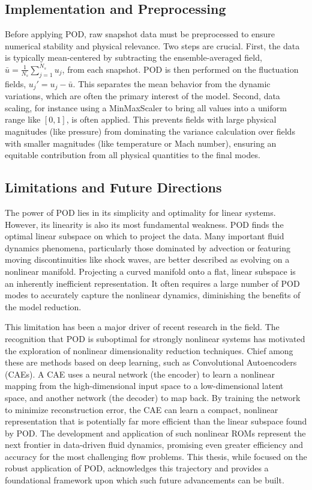 \documentclass[dscexam, EN]{ufabcFHZh}
\begin{document}
\subsection{Implementation and Preprocessing}

Before applying POD, raw snapshot data must be preprocessed to ensure numerical stability and physical relevance. Two steps are crucial. First, the data is typically mean-centered by subtracting the ensemble-averaged field, $\bar{u} = \frac{1}{N_s}\sum_{j=1}^{N_s} u_j$, from each snapshot. POD is then performed on the fluctuation fields, $u_j' = u_j - \bar{u}$. This separates the mean behavior from the dynamic variations, which are often the primary interest of the model. Second, data scaling, for instance using a MinMaxScaler to bring all values into a uniform range like $[0, 1]$, is often applied. This prevents fields with large physical magnitudes (like pressure) from dominating the variance calculation over fields with smaller magnitudes (like temperature or Mach number), ensuring an equitable contribution from all physical quantities to the final modes.

\subsection{Limitations and Future Directions}

The power of POD lies in its simplicity and optimality for linear systems. However, its linearity is also its most fundamental weakness. POD finds the optimal linear subspace on which to project the data. Many important fluid dynamics phenomena, particularly those dominated by advection or featuring moving discontinuities like shock waves, are better described as evolving on a nonlinear manifold. Projecting a curved manifold onto a flat, linear subspace is an inherently inefficient representation. It often requires a large number of POD modes to accurately capture the nonlinear dynamics, diminishing the benefits of the model reduction. 

This limitation has been a major driver of recent research in the field. The recognition that POD is suboptimal for strongly nonlinear systems has motivated the exploration of nonlinear dimensionality reduction techniques. Chief among these are methods based on deep learning, such as Convolutional Autoencoders (CAEs). A CAE uses a neural network (the encoder) to learn a nonlinear mapping from the high-dimensional input space to a low-dimensional latent space, and another network (the decoder) to map back. By training the network to minimize reconstruction error, the CAE can learn a compact, nonlinear representation that is potentially far more efficient than the linear subspace found by POD. The development and application of such nonlinear ROMs represent the next frontier in data-driven fluid dynamics, promising even greater efficiency and accuracy for the most challenging flow problems. This thesis, while focused on the robust application of POD, acknowledges this trajectory and provides a foundational framework upon which such future advancements can be built. 
\end{document}
